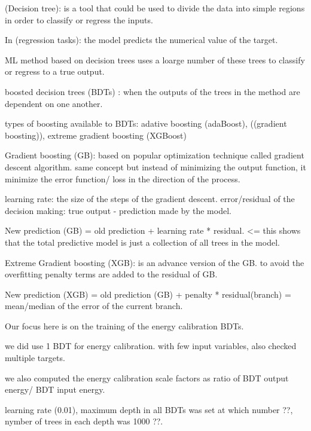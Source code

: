 
(Decision tree): is a tool that could be used to divide the data into simple regions in order to classify or regress the inputs.

In (regression tasks): the model predicts the numerical value of the target.

ML method based on decision trees uses a loarge number of these trees to classify or regress to a true output.

boosted decision trees (BDTs) : when the outputs of the trees in the method are dependent on one another.

types of boosting available to BDTs: adative boosting (adaBoost), ((gradient boosting)), extreme gradient boosting (XGBoost)

  
Gradient boosting (GB): based on popular optimization technique called gradient descent algorithm.
same concept but instead of minimizing the output function, it minimize the error function/ loss in the direction of the process.

learning rate: the size of the steps of the gradient descent.
error/residual of the decision making: true output - prediction made by the model.

New prediction (GB)  = old prediction + learning rate * residual. <= this shows that the total predictive model is just a collection of all trees in the model.


Extreme Gradient boosting (XGB): is an advance version of the GB. to avoid the overfitting penalty terms are added to the residual of GB.

New prediction (XGB) = old prediction (GB) + penalty * residual(branch) = mean/median of the error of the current branch.



Our focus here is on the training of the energy calibration BDTs.

we did use 1 BDT for energy calibration. with few input variables, also checked multiple targets.

we also computed the energy calibration scale factors as ratio of BDT output energy/ BDT input energy.


learning rate (0.01), maximum depth in all BDTs was set at which number ??, nymber of trees in each depth was 1000 ??.

